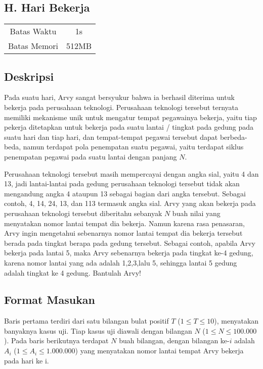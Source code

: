 \documentclass{article}
\begin{document}
\begin{center}
    \section*{H. Hari Bekerja}

    \begin{tabular}{ | c c | }
        \hline
        Batas Waktu  & 1s \\
        Batas Memori & 512MB \\ 
        \hline
    \end{tabular}
\end{center}

\subsection*{Deskripsi}

Pada suatu hari, Arvy sangat bersyukur bahwa ia berhasil diterima untuk bekerja pada perusahaan teknologi. Perusahaan teknologi tersebut ternyata memiliki mekanisme unik untuk mengatur tempat pegawainya bekerja, yaitu tiap pekerja ditetapkan untuk bekerja pada suatu lantai / tingkat pada gedung pada suatu hari dan tiap hari, dan tempat-tempat pegawai tersebut dapat berbeda-beda, namun terdapat pola penempatan suatu pegawai, yaitu terdapat siklus penempatan pegawai pada suatu lantai dengan panjang $N$. 

Perusahaan teknologi tersebut masih mempercayai dengan angka sial, yaitu 4 dan 13, jadi lantai-lantai pada gedung perusahaan teknologi tersebut tidak akan mengandung angka 4 ataupun 13 sebagai bagian dari angka tersebut. Sebagai contoh, 4, 14, 24, 13, dan 113 termasuk angka sial. Arvy yang akan bekerja pada perusahaan teknologi tersebut diberitahu sebanyak $N$ buah nilai yang menyatakan nomor lantai tempat dia bekerja. Namun karena rasa penasaran, Arvy ingin mengetahui sebenarnya nomor lantai tempat dia bekerja tersebut berada pada tingkat berapa pada gedung tersebut. Sebagai contoh, apabila Arvy bekerja pada lantai 5, maka Arvy sebenarnya bekerja pada tingkat ke-4 gedung, karena nomor lantai yang ada adalah 1,2,3,lalu 5, sehingga lantai 5 gedung adalah tingkat ke 4 gedung. Bantulah Arvy!

\subsection*{Format Masukan}

Baris pertama terdiri dari satu bilangan bulat positif $T$ ($1 \leq T \leq 10$), menyatakan banyaknya kasus uji.
Tiap kasus uji diawali dengan bilangan $N$ ($1 \leq N \leq 100.000$).
Pada baris berikutnya terdapat $N$ buah bilangan, dengan bilangan ke-$i$ adalah $A_i$ ($1 \leq A_i \leq 1.000.000$) yang menyatakan nomor lantai tempat Arvy bekerja pada hari ke i.
\end{document}
